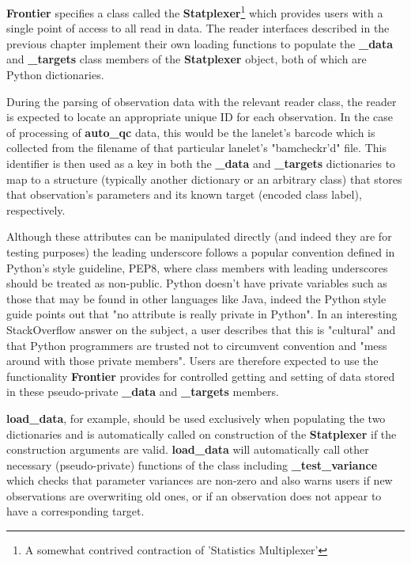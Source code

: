 \textbf{Frontier} specifies a class called the \textbf{Statplexer}\footnote{A somewhat
contrived contraction of 'Statistics Multiplexer'} which provides users with a
single point of access to all read in data. The reader interfaces described in
the previous chapter implement their own loading functions to populate the
\textbf{\_data} and \textbf{\_targets} class members of the \textbf{Statplexer}
object, both of which are Python dictionaries.

During the parsing of observation data with the relevant reader class, the
reader is expected to locate an appropriate unique ID for each observation. In
the case of processing of \textbf{auto\_qc} data, this would be the lanelet's
barcode which is collected from the filename of that particular lanelet's
"bamcheckr'd" file.
This identifier is then used as a key in both the \textbf{\_data} and
\textbf{\_targets} dictionaries to map to a structure (typically another
dictionary or an arbitrary class) that stores that observation's parameters
and its known target (encoded class label), respectively.

Although these attributes can be manipulated directly (and indeed they are for
testing purposes) the leading underscore follows a popular convention defined in
Python's style guideline, PEP8\citep{pep8}, where class members with leading
underscores should be treated as non-public. Python doesn't have private
variables such as those that may be found in other languages like Java, indeed
the Python style guide points out that "no attribute is really private in
Python"\citep{pep8}. In an interesting StackOverflow answer on the subject, a
user describes that this is "cultural"\citep{so:pythonprivate} and that Python
programmers are trusted not to circumvent convention and "mess around with those
private members". Users are therefore expected to use the functionality
\textbf{Frontier} provides for controlled getting and setting of data stored in these
pseudo-private \textbf{\_data} and \textbf{\_targets} members.

\textbf{load\_data}, for example, should be used exclusively when populating
the two dictionaries and is automatically called on construction of the
\textbf{Statplexer} if the construction arguments are valid.
\textbf{load\_data} will automatically call other necessary (pseudo-private)
functions of the class including \textbf{\_test\_variance} which checks that
parameter variances are non-zero and also warns users if new observations
are overwriting old ones, or if an observation does not appear to have a
corresponding target.

